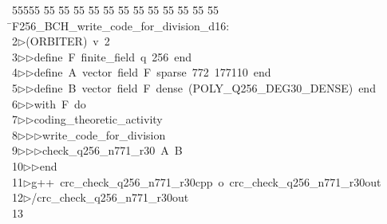 %
%
\begin{tabbing}
55555 \= 55 \= 55 \= 55 \= 55 \= 55 \= 55 \= 55 \= 55 \= 55 \= 55 \= 55 \= 55 \= \>F256\_BCH\_write\_code\_for\_division\_d16:\\[0pt]
2\>$\triangleright$\>(ORBITER)\ v\ 2\ \\[0pt]
3\>$\triangleright$\>$\triangleright$\>define\ F\ finite\_field\ q\ 256\ end\ \\[0pt]
4\>$\triangleright$\>$\triangleright$\>define\ A\ vector\ field\ F\ sparse\ 772\ 177110\ end\ \\[0pt]
5\>$\triangleright$\>$\triangleright$\>define\ B\ vector\ field\ F\ dense\ (POLY\_Q256\_DEG30\_DENSE)\ end\ \\[0pt]
6\>$\triangleright$\>$\triangleright$\>with\ F\ do\ \\[0pt]
7\>$\triangleright$\>$\triangleright$\>coding\_theoretic\_activity\ \\[0pt]
8\>$\triangleright$\>$\triangleright$\>$\triangleright$\>write\_code\_for\_division\ \\[0pt]
9\>$\triangleright$\>$\triangleright$\>$\triangleright$\>check\_q256\_n771\_r30\ A\ B\ \\[0pt]
10\>$\triangleright$\>$\triangleright$\>end\\[0pt]
11\>$\triangleright$\>g++\ crc\_check\_q256\_n771\_r30cpp\ o\ crc\_check\_q256\_n771\_r30out\\[0pt]
12\>$\triangleright$\>/crc\_check\_q256\_n771\_r30out\\[0pt]
13\>\end{tabbing}
